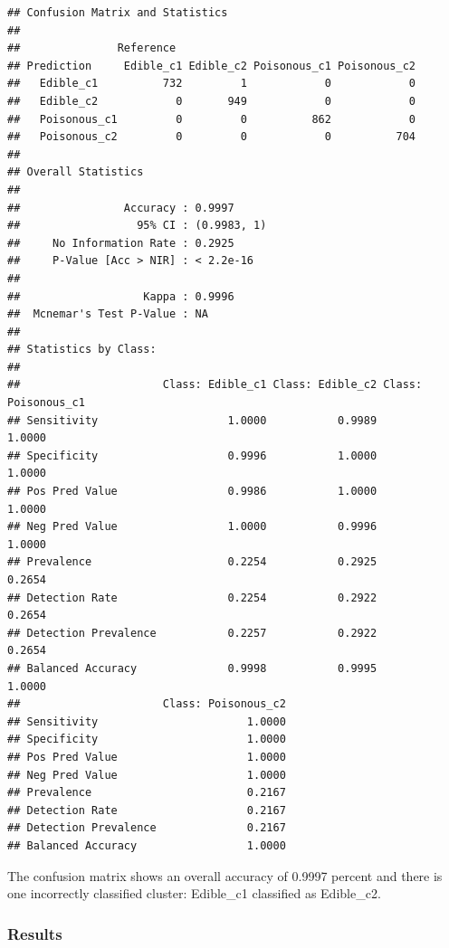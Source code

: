 \documentclass[10pt  ,usenames, dvipsnames]{article}\usepackage[]{graphicx}\usepackage[]{color}
\makeatletter
\newenvironment{kframe}{%
 \def\at@end@of@kframe{}%
 \ifinner\ifhmode%
  \def\at@end@of@kframe{\end{minipage}}%
  \begin{minipage}{\columnwidth}%
 \fi\fi%
 \def\FrameCommand##1{\hskip\@totalleftmargin \hskip-\fboxsep
 \colorbox{shadecolor}{##1}\hskip-\fboxsep
     \hskip-\linewidth \hskip-\@totalleftmargin \hskip\columnwidth}%
 \MakeFramed {\advance\hsize-\width
   \@totalleftmargin\z@ \linewidth\hsize
   \@setminipage}}%
 {\par\unskip\endMakeFramed%
 \at@end@of@kframe}
\newenvironment{knitrout}{}{} %
\makeatother
\begin{document}
\begin{knitrout}
\color{fgcolor}\begin{kframe}
\begin{verbatim}
## Confusion Matrix and Statistics
## 
##               Reference
## Prediction     Edible_c1 Edible_c2 Poisonous_c1 Poisonous_c2
##   Edible_c1          732         1            0            0
##   Edible_c2            0       949            0            0
##   Poisonous_c1         0         0          862            0
##   Poisonous_c2         0         0            0          704
## 
## Overall Statistics
##                                      
##                Accuracy : 0.9997     
##                  95% CI : (0.9983, 1)
##     No Information Rate : 0.2925     
##     P-Value [Acc > NIR] : < 2.2e-16  
##                                      
##                   Kappa : 0.9996     
##  Mcnemar's Test P-Value : NA         
## 
## Statistics by Class:
## 
##                      Class: Edible_c1 Class: Edible_c2 Class: Poisonous_c1
## Sensitivity                    1.0000           0.9989              1.0000
## Specificity                    0.9996           1.0000              1.0000
## Pos Pred Value                 0.9986           1.0000              1.0000
## Neg Pred Value                 1.0000           0.9996              1.0000
## Prevalence                     0.2254           0.2925              0.2654
## Detection Rate                 0.2254           0.2922              0.2654
## Detection Prevalence           0.2257           0.2922              0.2654
## Balanced Accuracy              0.9998           0.9995              1.0000
##                      Class: Poisonous_c2
## Sensitivity                       1.0000
## Specificity                       1.0000
## Pos Pred Value                    1.0000
## Neg Pred Value                    1.0000
## Prevalence                        0.2167
## Detection Rate                    0.2167
## Detection Prevalence              0.2167
## Balanced Accuracy                 1.0000
\end{verbatim}
\end{kframe}
\end{knitrout}

The confusion matrix shows an overall accuracy of  0.9997 percent and there is one incorrectly classified cluster: Edible_c1 classified as Edible_c2.

\clearpage
\subsubsection{Results}
\end{document}
